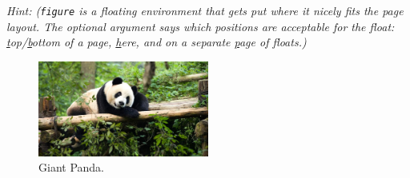 \documentclass[12pt]{article}
\begin{document}
	{\itshape Hint: (\texttt{figure} is a floating environment that gets put where it nicely fits the page layout. 
		The optional argument says which positions are acceptable for the float: 
		\underline{t}op/\underline{b}ottom of a page, \underline{h}ere, and on a separate \underline{p}age of floats.)}
	
	\begin{figure}[tbhp]
		\begin{center}
			\includegraphics[width=0.5\textwidth]{giant_panda.jpg}
		\end{center}
		\caption{Giant Panda.}
	\end{figure}
\end{document}
